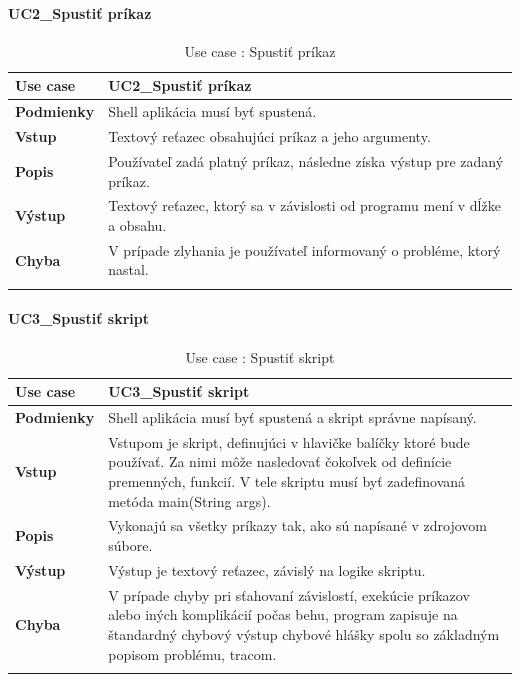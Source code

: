 \paragraph{UC2\_Spustiť príkaz}
\begin{center}
	\begin{longtable}{|p{2.5cm}|p{12.2cm}|}
		\hline
		\textbf{Use case} & UC2\_Spustiť príkaz \\ 
		\hline
		\textbf{Podmienky} & Shell aplikácia musí byť spustená. \\ 
		\hline
		\textbf{Vstup} & Textový reťazec obsahujúci príkaz a jeho argumenty.\\
		\hline
		\textbf{Popis} & Používateľ zadá platný príkaz, následne získa výstup pre zadaný príkaz. \\ 
		\hline
		\textbf{Výstup} & Textový reťazec, ktorý sa v závislosti od programu mení v dĺžke a obsahu.\\
		\hline
		\textbf{Chyba} & V prípade zlyhania je používateľ informovaný o probléme, ktorý nastal.\\
		\hline
		\caption{Use case : Spustiť príkaz}
		\label{table:1}
	\end{longtable}
	
\end{center}
\paragraph{UC3\_Spustiť skript}
\begin{center}
	\begin{longtable}{|p{2.5cm}|p{12.2cm}|}
		\hline
		\textbf{Use case} & UC3\_Spustiť skript \\ 
		\hline
		\textbf{Podmienky} & Shell aplikácia musí byť spustená a skript správne napísaný.\\ 
		\hline
		\textbf{Vstup} & Vstupom je skript, definujúci v hlavičke balíčky ktoré bude používať. Za nimi môže nasledovať čokoľvek od definície premenných, funkcií. V tele skriptu musí byť zadefinovaná metóda main(String args).\\
		\hline
		\textbf{Popis} & Vykonajú sa všetky príkazy tak, ako sú napísané v zdrojovom súbore. \\ 
		\hline
		\textbf{Výstup} & Výstup je textový reťazec, závislý na logike skriptu.\\
		\hline
		\textbf{Chyba} & V prípade chyby pri sťahovaní závislostí, exekúcie príkazov alebo iných komplikácií počas behu, program zapisuje na štandardný chybový výstup chybové hlášky spolu so základným popisom problému, tracom.\\
		\hline
		\caption{Use case : Spustiť skript}
		\label{table:1}
	\end{longtable}

\end{center}

